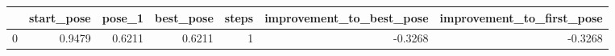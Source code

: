 \begin{tabular}{lrrrrrr}
\toprule
{} &  start\_pose &  pose\_1 &  best\_pose &  steps &  improvement\_to\_best\_pose &  improvement\_to\_first\_pose \\
\midrule
0 &      0.9479 &  0.6211 &     0.6211 &      1 &                   -0.3268 &                    -0.3268 \\
\bottomrule
\end{tabular}
